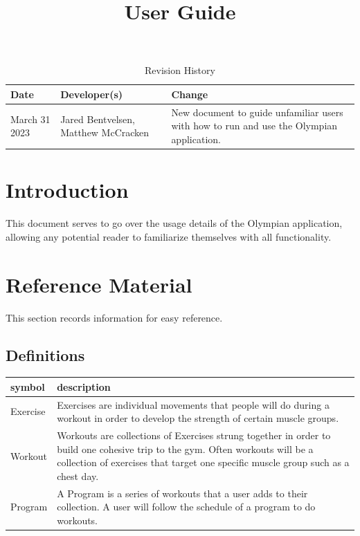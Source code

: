 \documentclass{article}
\title{User Guide\\\progname}
\author{\authname}
\date{}
\begin{document}
\begin{table}[hp]
\caption{Revision History} \label{TblRevisionHistory}
\begin{tabularx}{\textwidth}{llX}
\toprule
\textbf{Date} & \textbf{Developer(s)} & \textbf{Change}\\
\midrule
March 31 2023 & Jared Bentvelsen, Matthew McCracken & New document to guide unfamiliar users with how to run and use the Olympian application.\\
\bottomrule
\end{tabularx}
\end{table}

\newpage

\maketitle

\tableofcontents

\section{Introduction}

This document serves to go over the usage details of the Olympian application, allowing any potential reader to familiarize themselves with all functionality.

\section{Reference Material}

This section records information for easy reference.

\subsection{Definitions}

\renewcommand{\arraystretch}{1.2}
\begin{tabular}{|l|p{1\linewidth}|}
  \toprule		
  \textbf{symbol} & \textbf{description}\\
  \midrule   
  Exercise & Exercises are individual movements that people will do during a workout in order to develop the strength of certain muscle groups.\\
  Workout & Workouts are collections of Exercises strung together in order to build one cohesive trip to the gym. Often workouts will be a collection of exercises that target one specific muscle group such as a chest day.\\
  Program & A Program is a series of workouts that a user adds to their collection. A user will follow the schedule of a program to do workouts.\\
  \bottomrule
\end{tabular}\\
\end{document}
